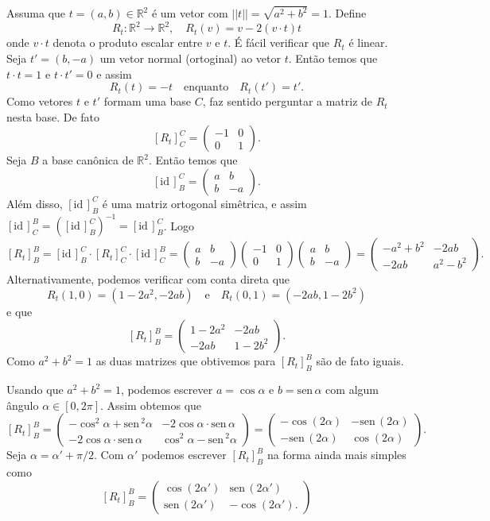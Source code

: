 \documentclass[12pt]{amsart}
\newcommand{\R}{\mathbb R}
\newcommand{\id}{\mbox{id}\,}
\newcommand{\sen}{\mbox{sen}\,}
\theoremstyle{definition}
\begin{document}
Assuma que $t=(a,b)\in\R^2$ é um vetor com $||t||=\sqrt{a^2+b^2}=1$. Define 
\[
    R_t:\R^2\to \R^2,\quad R_t(v)=v-2(v\cdot t)t
\] 
onde $v\cdot t$ denota o produto escalar entre $v$ e $t$. É fácil verificar que $R_t$ é linear. 
Seja $t'=(b,-a)$ um vetor normal (ortoginal) ao vetor $t$. Então temos que $t\cdot t=1$ e $t\cdot t'=0$  
e assim 
\[
    R_t(t)=-t\quad\mbox{enquanto}\quad R_t(t')=t'.
\] 
Como vetores $t$  e $t'$ formam uma base $C$, faz sentido perguntar a matriz de $R_t$ nesta base. De fato 
\[
    [R_t]_C^C=\begin{pmatrix} -1 & 0 \\ 0 & 1\end{pmatrix}.
\]  
Seja $B$ a base canônica de $\R^2$. Então temos que 
\[
    [\id]_B^C=\begin{pmatrix} a & b \\ b & -a \end{pmatrix}.
\]
Além disso, $[\id]_B^C$ é uma matriz ortogonal simêtrica, e assim $[\id]_C^B=([\id]_B^C)^{-1}=[\id]_B^C$. 
Logo 
\[
    [R_t]_B^B=[\id]_B^C \cdot [R_t]_C^C\cdot [\id]_C^B=
    \begin{pmatrix} a & b \\ b & -a \end{pmatrix}\begin{pmatrix} -1 & 0 \\ 0 & 1\end{pmatrix}
    \begin{pmatrix} a & b \\ b & -a \end{pmatrix}=\begin{pmatrix}-a^2+b^2 & -2ab \\ -2ab & a^2-b^2
    \end{pmatrix}.
\]
Alternativamente, podemos verificar com conta direta que 
\[
    R_t(1,0)=(1-2a^2,-2ab)\quad\mbox{e}\quad R_t(0,1)=(-2ab,1-2b^2)
\]
e que 
\[
    [R_t]_B^B=\begin{pmatrix} 1-2a^2 & -2ab \\ -2ab & 1-2b^2\end{pmatrix}.
\]
Como $a^2+b^2=1$ as duas matrizes que obtivemos para $[R_t]_B^B$ são de fato iguais. 

Usando que $a^2+b^2=1$, podemos escrever $a=\cos\alpha$ e $b=\sen\alpha$ com algum ângulo $\alpha\in[0,2\pi]$.
Assim obtemos que 
\[ 
    [R_t]_B^B=\begin{pmatrix} -\cos^2\alpha +\sen^2\alpha & -2\cos \alpha\cdot \sen\alpha\\ 
        -2\cos \alpha\cdot \sen\alpha & \cos^2\alpha-\sen^2\alpha\end{pmatrix}
        =\begin{pmatrix}-\cos(2\alpha) & -\sen(2\alpha) \\ -\sen(2\alpha) & \cos(2\alpha)
        \end{pmatrix}.
\]
Seja $\alpha=\alpha'+\pi/2$. Com $\alpha'$ podemos escrever $[R_t]_B^B$ na forma ainda mais simples 
como 
\[
    [R_t]_B^B=\begin{pmatrix}\cos(2\alpha') & \sen(2\alpha') \\ \sen(2\alpha') & -\cos(2\alpha').
    \end{pmatrix}
\]
\end{document}
